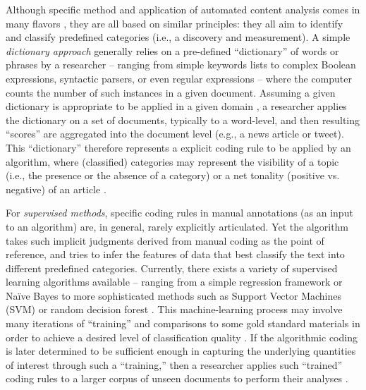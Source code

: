 \documentclass[man, 12pt, a4paper, nolmodern, noextraspace]{apa6}
\begin{document}
    Although specific method and application of automated content analysis comes in many flavors \parencites[for a broad overview, see:][]{Boumans_Trilling_2016, grimmer2013text}, they are all based on similar principles: they all aim to identify and classify predefined categories (i.e., a discovery and measurement). A simple \textit{dictionary approach} generally relies on a pre-defined “dictionary” of words or phrases by a researcher -- ranging from simple keywords lists to complex Boolean expressions, syntactic parsers, or even regular expressions -- where the computer counts the number of such instances in a given document. Assuming a given dictionary is appropriate to be applied in a given domain \parencite{Boumans_Trilling_2016, gonzalez2015signals}, a researcher applies the dictionary on a set of documents, typically to a word-level, and then resulting \enquote{scores} are aggregated into the document level (e.g., a news article or tweet). This \enquote{dictionary} therefore represents a explicit coding rule to be applied by an algorithm, where (classified) categories may represent the visibility of a topic (i.e., the presence or the absence of a category) or a net tonality (positive vs. negative) of an article \parencites[e.g.,][]{Aaldering2016, YoungSoroka2012, boomgaaden2009, gonzalez2015signals, Rooduijn2011}. 
    
    For \textit{supervised methods}, specific coding rules in manual annotations (as an input to an algorithm) are, in general, rarely explicitly articulated. Yet the algorithm takes such implicit judgments derived from manual coding as the point of reference, and tries to infer the features of data that best classify the text into different predefined categories. Currently, there exists a variety of supervised learning algorithms available -- ranging from a simple regression framework or Naïve Bayes to more sophisticated methods such as Support Vector Machines (SVM) or random decision forest \parencites[for an overview, see][]{hindman2015building}. This machine-learning process may involve many iterations of \enquote{training} and comparisons to some gold standard materials in order to achieve a desired level of classification quality \parencites[e.g.,][]{scharkow2013thematic}. If the algorithmic coding is later determined to be sufficient enough in capturing the underlying quantities of interest through such a \enquote{training,} then a researcher applies such \enquote{trained} coding rules to a larger corpus of unseen documents to perform their analyses \parencites[e.g.,][]{burscher2015using, burscher2014teaching, scharkow2013thematic, gonzalez2015signals}.    
    
\end{document}

